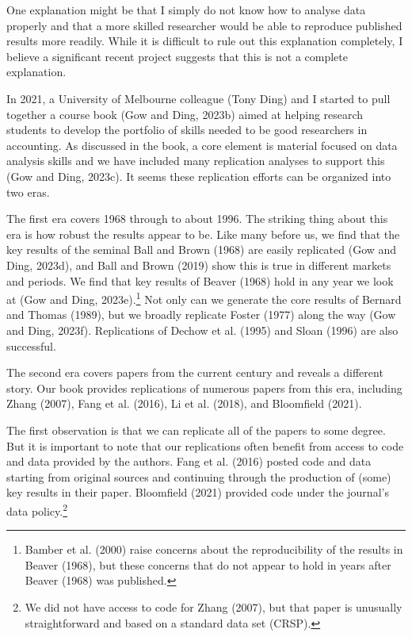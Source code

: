 \documentclass[
  letterpaper,
  DIV=11,
  numbers=noendperiod]{scrartcl}
\begin{document}
One explanation might be that I simply do not know how to analyse data
properly and that a more skilled researcher would be able to reproduce
published results more readily. While it is difficult to rule out this
explanation completely, I believe a significant recent project suggests
that this is not a complete explanation.

In 2021, a University of Melbourne colleague (Tony Ding) and I started
to pull together a course book (Gow and Ding, 2023b) aimed at helping
research students to develop the portfolio of skills needed to be good
researchers in accounting. As discussed in the book, a core element is
material focused on data analysis skills and we have included many
replication analyses to support this (Gow and Ding, 2023c). It seems
these replication efforts can be organized into two eras.

The first era covers 1968 through to about 1996. The striking thing
about this era is how robust the results appear to be. Like many before
us, we find that the key results of the seminal Ball and Brown (1968)
are easily replicated (Gow and Ding, 2023d), and Ball and Brown (2019)
show this is true in different markets and periods. We find that key
results of Beaver (1968) hold in any year we look at (Gow and Ding,
2023e).\footnote{Bamber et al. (2000) raise concerns about the
  reproducibility of the results in Beaver (1968), but these concerns
  that do not appear to hold in years after Beaver (1968) was published.}
Not only can we generate the core results of Bernard and Thomas (1989),
but we broadly replicate Foster (1977) along the way (Gow and Ding,
2023f). Replications of Dechow et al. (1995) and Sloan (1996) are also
successful.

The second era covers papers from the current century and reveals a
different story. Our book provides replications of numerous papers from
this era, including Zhang (2007), Fang et al. (2016), Li et al. (2018),
and Bloomfield (2021).

The first observation is that we can replicate all of the papers to some
degree. But it is important to note that our replications often benefit
from access to code and data provided by the authors. Fang et al. (2016)
posted code and data starting from original sources and continuing
through the production of (some) key results in their paper. Bloomfield
(2021) provided code under the journal's data policy.\footnote{We did
  not have access to code for Zhang (2007), but that paper is unusually
  straightforward and based on a standard data set (CRSP).}
\end{document}
